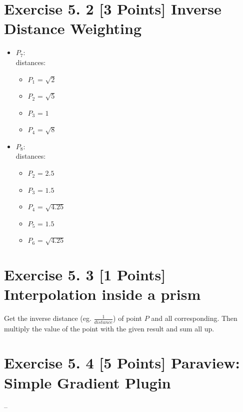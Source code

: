 \documentclass[a4paper]{article}
\begin{document}
\section*{Exercise 5. 2 [3 Points] Inverse Distance Weighting}
\begin{itemize}
	\item $ P_7 $:\\
	distances:
	\begin{itemize}
		\item $ P_1 $ = $ \sqrt{2} $
		\item $ P_2 $ = $ \sqrt{5} $
		\item $ P_3 $ = $ 1 $
		\item $ P_4 $ = $ \sqrt{8} $
	\end{itemize}
	\item $ P_8 $:\\
	distances:
	\begin{itemize}
		\item $ P_2 $ = $ 2.5 $
		\item $ P_3 $ = $ 1.5 $
		\item $ P_4 $ = $ \sqrt{4.25} $
		\item $ P_5 $ = $ 1.5 $
		\item $ P_6 $ = $ \sqrt{4.25} $
	\end{itemize}
\end{itemize}


\section*{Exercise 5. 3 [1 Points] Interpolation inside a prism}
	Get the inverse distance (eg. $ \frac{1}{distance} $) of point $ P $ and all corresponding. Then multiply the value of the point with the given result and sum all up.


\section*{Exercise 5. 4 [5 Points] Paraview: Simple Gradient Plugin}
--
	
\end{document}
